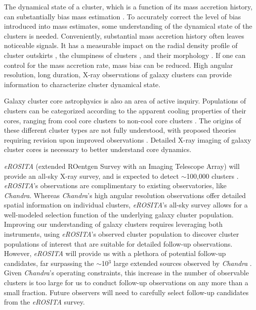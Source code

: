 The dynamical state of a cluster, which is a function of its mass accretion history, can substantially bias mass estimation \cite[e.g.,][]{Lau_2009, Nelson_2014, Shi_2015}. To accurately correct the level of bias introduced into mass estimates, some understanding of the dynamical state of the clusters is needed. Conveniently, substantial mass accretion history often leaves noticeable signals. It has a measurable impact on the radial density profile of cluster outskirts \cite{Diemer_2014}, the clumpiness of clusters \cite{Diasuke_Lau_2011}, and their morphology \cite{Evrard_1993}. If one can control for the mass accretion rate, mass bias can be reduced.  High angular resolution, long duration, X-ray observations of galaxy clusters can provide information to characterize cluster dynamical state.

Galaxy cluster core astrophysics is also an area of active inquiry. Populations of clusters can be categorized according to the apparent cooling properties of their cores, ranging from cool core clusters to non-cool core clusters \cite{Jones_Forman_1984}. The origins of these different cluster types are not fully understood, with proposed theories requiring revision upon improved observations \cite[see][ and references therein for reviews]{Fabian_1994, McNamara_Nulsen_2012, Inoue_2022}. Detailed X-ray imaging of galaxy cluster cores is necessary to better understand core dynamics.

\textit{eROSITA} (extended ROentgen Survey with an Imaging Telescope Array) \cite{eROSITA_Sciencebook_2012} will provide an all-sky X-ray survey, and is expected to detect $\sim$100,000 clusters \cite{Pillepich_2018}. \textit{eROSITA}'s observations are complimentary to existing observatories, like \textit{Chandra}. Whereas \textit{Chandra}'s high angular resolution observations offer detailed spatial information on individual clusters, \textit{eROSITA}'s all-sky survey allows for a well-modeled selection function of the underlying galaxy cluster population. Improving our understanding of galaxy clusters requires leveraging both instruments, using \textit{eROSITA}'s observed cluster population to discover cluster populations of interest that are suitable for detailed follow-up observations. However, \textit{eROSITA} will provide us with a plethora of potential follow-up candidates, far surpassing the $\sim$10$^{3}$ large extended sources observed by \textit{Chandra} \cite[the Chandra Source Catalog release 2;][]{Chandra_dr2_A,Chandra_dr2_B}. Given \textit{Chandra}'s operating constraints, this increase in the number of observable clusters is too large for us to conduct follow-up observations on any more than a small fraction. Future observers will need to carefully select follow-up candidates from the \textit{eROSITA} survey. 

